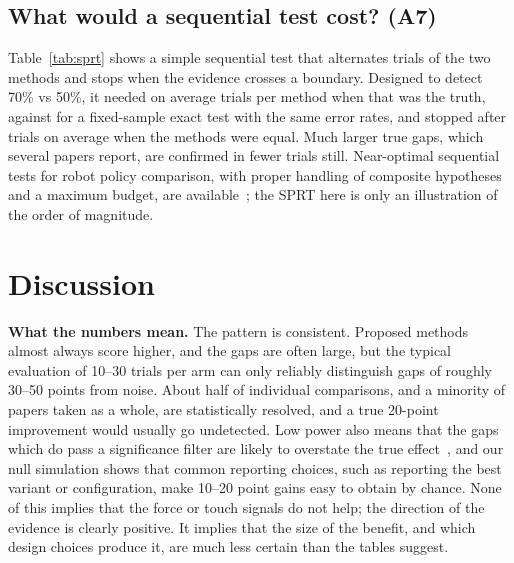 \documentclass[11pt]{article}
\begin{document}
\subsection{What would a sequential test cost? (A7)}
Table~\ref{tab:sprt} shows a simple sequential test that alternates trials of the two methods and stops when the evidence crosses a boundary. Designed to detect 70\% vs 50\%, it needed on average \AuditSPRTPairsSeventy{} trials per method when that was the truth, against \AuditFixedNSeventy{} for a fixed-sample exact test with the same error rates, and stopped after \AuditSPRTPairsNull{} trials on average when the methods were equal. Much larger true gaps, which several papers report, are confirmed in fewer trials still. Near-optimal sequential tests for robot policy comparison, with proper handling of composite hypotheses and a maximum budget, are available~\cite{snyder2025step,snyder2026nscore}; the SPRT here is only an illustration of the order of magnitude.

\begin{table}[t]
\centering
\caption{Wald SPRT on discordant pairs, designed for $p_X=0.5$ vs $p_P=0.7$ (one-sided $\alpha=0.025$, power 0.8, at most 500 pairs; 20{,}000 replicates). A fixed-sample two-sided Fisher test with 80\% power at 0.5 vs 0.7 needs \AuditFixedNSeventy{} trials per arm.}
\label{tab:sprt}

\end{table}

\section{Discussion}\label{sec:discussion}
\textbf{What the numbers mean.} The pattern is consistent. Proposed methods almost always score higher, and the gaps are often large, but the typical evaluation of 10--30 trials per arm can only reliably distinguish gaps of roughly 30--50 points from noise. About half of individual comparisons, and a minority of papers taken as a whole, are statistically resolved, and a true 20-point improvement would usually go undetected. Low power also means that the gaps which do pass a significance filter are likely to overstate the true effect~\cite{button2013,gelman2014}, and our null simulation shows that common reporting choices, such as reporting the best variant or configuration, make 10--20 point gains easy to obtain by chance. None of this implies that the force or touch signals do not help; the direction of the evidence is clearly positive. It implies that the size of the benefit, and which design choices produce it, are much less certain than the tables suggest.
\end{document}
